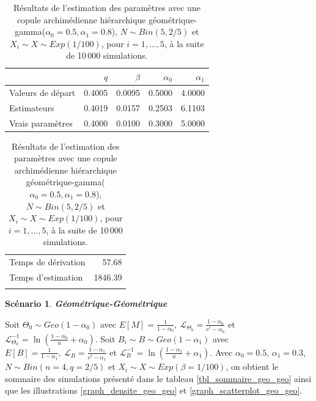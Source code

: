 \documentclass{article}
\newtheorem{Scenario}{Scénario}
\begin{document}
	\begin{table}[H]
		\centering
		\begin{tabular}{lrrrr}
			\hline
			& $q$ & $\beta$ & $\alpha_0$ & $\alpha_1$ \\ 
			\hline
			Valeurs de départ & 0.4005 & 0.0095 & 0.5000 & 4.0000 \\ 
			Estimateurs & 0.4019 & 0.0157 & 0.2503 & 6.1103 \\ 
			Vrais paramètres & 0.4000 & 0.0100 & 0.3000 & 5.0000 \\
			\hline
		\end{tabular}
		\begin{tabular}{lr}
			\hline
			&  \\ 
			\hline
			Temps de dérivation & 57.68 \\ 
			Temps d'estimation & 1846.39 \\ 
			\\
			\hline
		\end{tabular}
		\caption[Résultats du scénario \ref{scenario_geo_gamma}]{Résultats de l'estimation des paramètres avec une copule archimédienne hiérarchique géométrique-gamma($\alpha_0=0.5, \alpha_1=0.8$), $N \sim Bin(5, 2/5)$ et $X_i \sim X \sim Exp(1/100)$, pour $i=1,\dots,5$, à la suite de 10\,000 simulations.}
		\label{tbl_resultats_geo_gamma}
	\end{table}



		\begin{Scenario}\label{scenario_geo_geo}
			\textbf{Géométrique-Géométrique}
		\end{Scenario}
		
		Soit $\Theta_0 \sim Geo(1-\alpha_0)$ avec $E[M] = \frac{1}{1-\alpha_0},\ \mathscr{L}_{\Theta_0} = \frac{1-\alpha_0}{e^t-\alpha_0}$ et $\mathscr{L}^{-1}_{\Theta_0} = \ln\left(\frac{1 - \alpha_0}{u}+\alpha_0\right)$.
			Soit $B_i \sim B \sim Geo(1-\alpha_1)$ avec $E[B] = \frac{1}{1-\alpha_1},\ \mathscr{L}_{B} = \frac{1-\alpha_1}{e^t-\alpha_1}$ et $\mathscr{L}^{-1}_{B} = \ln\left(\frac{1 - \alpha_1}{u}+\alpha_1\right)$. Avec $\alpha_0 = 0.5$, $\alpha_1 = 0.3$, $N\sim Bin(n=4, q=2/5)$ et $X_i \sim X \sim Exp(\beta = 1/100)$, on obtient le sommaire des simulations présenté dans le tableau \ref{tbl_sommaire_geo_geo} ainsi que les illustrations \ref{graph_densite_geo_geo} et \ref{graph_scatterplot_geo_geo}.
		
\end{document}
